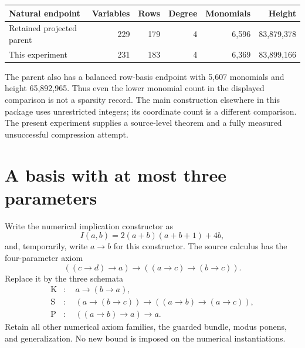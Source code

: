 \documentclass[11pt]{article}
\newcommand{\imp}{\mathbin{\to}}
\begin{document}
\begin{center}
\begin{tabular}{lrrrrr}
\toprule
Natural endpoint & Variables & Rows & Degree & Monomials & Height\\
\midrule
Retained projected parent &229&179&4&6,596&83,879,378\\
This experiment &231&183&4&6,369&83,899,166\\
\bottomrule
\end{tabular}
\end{center}
The parent also has a balanced row-basis endpoint with 5,607 monomials and
height 65,892,965. Thus even the lower monomial count in the displayed
comparison is not a sparsity record. The main construction elsewhere in this
package uses unrestricted integers; its coordinate count is a different
comparison. The present experiment supplies a source-level theorem and a
fully measured unsuccessful compression attempt.

\section{A basis with at most three parameters}

Write the numerical implication constructor as
\[
 I(a,b)=2(a+b)(a+b+1)+4b,
\]
and, temporarily, write $a\imp b$ for this constructor. The source calculus
has the four-parameter axiom
\begin{equation}\label{old}
 ((c\imp d)\imp a)\imp((a\imp c)\imp(b\imp c)).
\end{equation}
Replace it by the three schemata
\begin{align*}
 \mathrm K&:\quad a\imp(b\imp a),\\
 \mathrm S&:\quad(a\imp(b\imp c))\imp((a\imp b)\imp(a\imp c)),\\
 \mathrm P&:\quad((a\imp b)\imp a)\imp a.
\end{align*}
Retain all other numerical axiom families, the guarded bundle, modus ponens,
and generalization. No new bound is imposed on the numerical instantiations.
\end{document}
